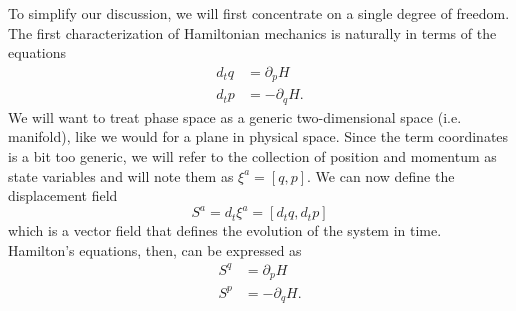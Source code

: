 To simplify our discussion, we will first concentrate on a single degree of freedom. The first characterization of Hamiltonian mechanics is naturally in terms of the equations
\begin{equation}\label{rp-cm-hsd-condEquations}
	\tag{HM-1S}
	\begin{aligned}
		d_t q &= \partial_p H \\
		d_t p &= - \partial_q H.
	\end{aligned}
\end{equation}
We will want to treat phase space as a generic two-dimensional space (i.e. manifold), like we would for a plane in physical space. Since the term coordinates is a bit too generic, we will refer to the collection of position and momentum as state variables and will note them as $\xi^a = [q, p]$. We can now define the displacement field
\begin{equation}\label{rp-cm-displacement1d}
	S^a = d_t \xi^a = [d_t q, d_t p]
\end{equation}
which is a vector field that defines the evolution of the system in time. Hamilton's equations, then, can be expressed as
\begin{equation}\label{rp-cm-hsd-displacementCurl}
	\begin{aligned}
		S^q &= \partial_p H \\
		S^p &= - \partial_q H.
	\end{aligned}
\end{equation}

